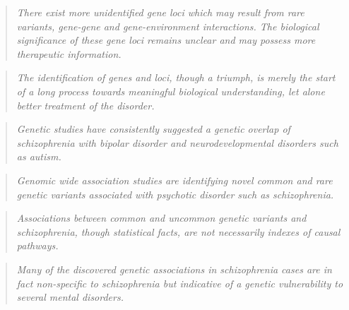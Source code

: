 \begin{quotation}
	\textit{There exist more unidentified gene loci which may result from rare variants, gene-gene and gene-environment interactions. The biological significance of these gene loci remains unclear and may possess more therapeutic information.}
	\begin{flushright}
		\cite{harrison2015recent}
	\end{flushright}
\end{quotation}
\begin{quotation}
	\textit{The identification of genes and loci, though a triumph, is merely the start of a long process towards meaningful biological understanding, let alone better treatment of the disorder.}
	\begin{flushright}
		\cite{harrison2015recent}
	\end{flushright}
\end{quotation}
\begin{quotation}
	\textit{Genetic studies have consistently suggested a genetic overlap of schizophrenia with bipolar disorder and neurodevelopmental disorders such as autism.}
	\begin{flushright}
		\cite{van2010genome}
	\end{flushright}
\end{quotation}
\begin{quotation}
	\textit{Genomic wide association studies are identifying novel common and rare genetic variants associated with psychotic disorder such as schizophrenia.}
	\begin{flushright}
		\cite{van2010genome}
	\end{flushright}
\end{quotation}
\begin{quotation}
	\textit{Associations between common and uncommon genetic variants and schizophrenia, though statistical facts, are not necessarily indexes of causal pathways.}
	\begin{flushright}
		\cite{henriksen2017genetics}
	\end{flushright}
\end{quotation}
\begin{quotation}
	\textit{Many of the discovered genetic associations in schizophrenia cases are in fact non-specific to schizophrenia but indicative of a genetic vulnerability to several mental disorders.}
	\begin{flushright}
		\cite{henriksen2017genetics}
	\end{flushright}
\end{quotation}
